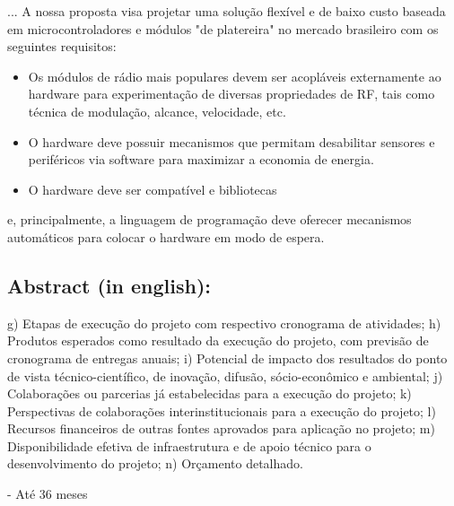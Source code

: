 \documentclass[titlepage,12pt]{article}
\begin{document}
...
%
A nossa proposta visa projetar uma solução flexível e de baixo custo baseada em
microcontroladores e módulos "de platereira" no mercado brasileiro com os
seguintes requisitos:
%
\begin{itemize}
\item Os módulos de rádio mais populares devem ser acopláveis externamente ao
      hardware para experimentação de diversas propriedades de RF, tais como
      técnica de modulação, alcance, velocidade, etc.
\item O hardware deve possuir mecanismos que permitam desabilitar sensores e
      periféricos via software para maximizar a economia de energia.
\item O hardware deve ser compatível e bibliotecas
\end{itemize}


 e, principalmente, a linguagem de
programação deve oferecer mecanismos automáticos para colocar o hardware em
modo de espera.

\begin{comment}

Problemas com hardware para pesquisa científica
    - flexibilidade é importante
    - principalmente para o radio
    - custo para reproduzir
        - SoC, SMD, prontos/caros/inflexíveis
    - consumo ainda alto
        - transistores para desligar sensores
    - Solução
        - módulos off-the-shelf de fácil ligacao, jumpers/headers/solda/PCB vs SMD
        - The main advantages of SMT over the older through-hole technique are: 
            - https://en.wikipedia.org/wiki/Through-hole_technology
            - https://en.wikipedia.org/wiki/Surface-mount_technology

\end{comment}

\subsection{ Abstract (in english): }


g) Etapas de execução do projeto com respectivo cronograma de atividades;
h) Produtos esperados como resultado da execução do projeto, com previsão de cronograma
de entregas anuais;
i) Potencial de impacto dos resultados do ponto de vista técnico-científico, de inovação,
difusão, sócio-econômico e ambiental;
j) Colaborações ou parcerias já estabelecidas para a execução do projeto;
k) Perspectivas de colaborações interinstitucionais para a execução do projeto;
l) Recursos financeiros de outras fontes aprovados para aplicação no projeto;
m) Disponibilidade efetiva de infraestrutura e de apoio técnico para o desenvolvimento do
projeto;
n) Orçamento detalhado.

- Até 36 meses


 
\end{document}
